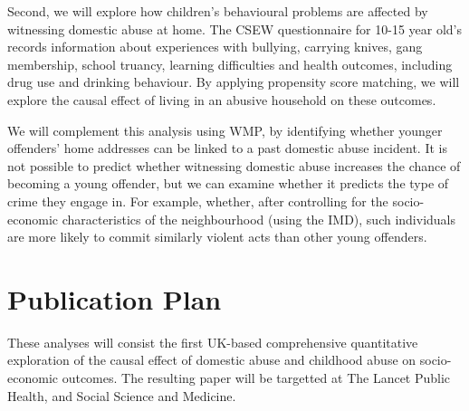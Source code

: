 \documentclass[11pt, a4paper]{article}
\begin{document}
%
%



Second, we will explore how children's behavioural problems are affected by witnessing domestic abuse at home. The CSEW questionnaire for 10-15 year old's records information about experiences with bullying, carrying knives, gang membership, school truancy, learning difficulties and health outcomes, including drug use and drinking behaviour. By applying propensity score matching, we will explore the causal effect of living in an abusive household on these outcomes.

We will complement this analysis using WMP, by identifying whether younger offenders' home addresses can be linked to a past domestic abuse incident. It is not possible to predict whether witnessing domestic abuse increases the chance of becoming a young offender, but we can examine whether it predicts the type of crime they engage in. For example, whether, after controlling for the socio-economic characteristics of the neighbourhood (using the IMD), such individuals are more likely to commit similarly violent acts than other young offenders.

 
 \section{Publication Plan}
 These analyses will consist the first UK-based comprehensive quantitative exploration of the causal effect of domestic abuse and childhood abuse on socio-economic outcomes. The resulting paper will be targetted at The Lancet Public Health, and Social Science and Medicine.
 
\end{document}
